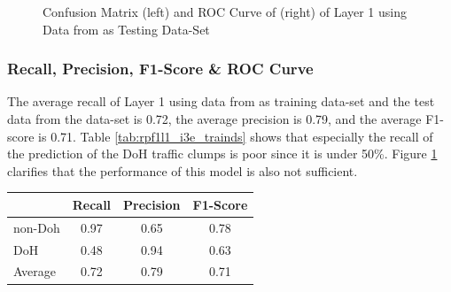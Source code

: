 \begin{figure}[ht]
\centering
{}\hspace{1.0cm}
\caption{Confusion Matrix (left) and ROC Curve of (right) of Layer 1 using Data from \cite{ieee_dataset} as Testing Data-Set}
\label{fig:con_roc_l1_i3e_trainds}
\end{figure}

\subsubsection{Recall, Precision, F1-Score \& ROC Curve}
The average recall of Layer 1 using data from \cite{ieee_dataset} as training data-set and the test data from the data-set \cite{CIRA-CIC-DoHBrw-2020} is 0.72, the average precision is 0.79, and the average F1-score is 0.71. Table \ref{tab:rpf1l1_i3e_trainds} shows that especially the recall of the prediction of the DoH traffic clumps is poor since it is under 50\%. Figure \ref{fig:con_roc_l1_i3e_trainds} clarifies that the performance of this model is also not sufficient.

\begin{center}
\begin{longtable}{ |l|c|c|c| }
\hline
 & Recall & Precision & F1-Score \\
\hline
non-Doh & 0.97 & 0.65 & 0.78 \\
\hline
DoH & 0.48 & 0.94 & 0.63 \\
\hline
Average & 0.72 & 0.79 & 0.71 \\ 
\hline
\end{longtable}
\label{tab:rpf1l1_i3e_trainds}
\end{center}

